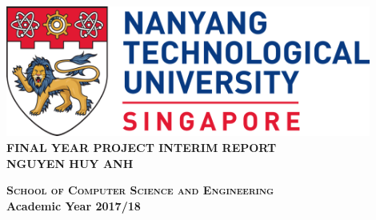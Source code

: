 \begin{titlepage}
\begin{center}

\includegraphics[width=0.9\textwidth]{images/ntu_logo.png}
\\[5cm]

\uppercase{\textbf{Final Year Project Interim Report}}
\\[5cm]

\uppercase{\textbf{Nguyen Huy Anh}}

\vfill

\textsc{\bfseries School of Computer Science and Engineering}
\\
\textbf{Academic Year 2017/18}

\end{center}
\end{titlepage}
